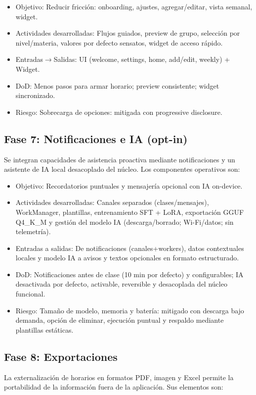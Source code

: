 \begin{itemize}
  \item Objetivo: Reducir fricción: onboarding, ajustes, agregar/editar, vista semanal, widget.
  \item Actividades desarrolladas: Flujos guiados, preview de grupo, selección por nivel/materia, valores por defecto sensatos, widget de acceso rápido.
  \item Entradas$\rightarrow$Salidas: UI (welcome, settings, home, add/edit, weekly) + Widget.
  \item DoD: Menos pasos para armar horario; preview consistente; widget sincronizado.
  \item Riesgo: Sobrecarga de opciones: mitigada con progressive disclosure.
\end{itemize}

\subsection{Fase 7: Notificaciones e IA (opt-in)}
Se integran capacidades de asistencia proactiva mediante notificaciones y un asistente de IA local desacoplado del núcleo. Los componentes operativos son:

\begin{itemize}
  \item Objetivo: Recordatorios puntuales y mensajería opcional con IA on-device.
  \item Actividades desarrolladas: Canales separados (clases/mensajes), WorkManager, plantillas, entrenamiento SFT + LoRA, exportación GGUF Q4\_K\_M y gestión del modelo IA (descarga/borrado; Wi-Fi/datos; sin telemetría).
  \item Entradas a salidas: De notificaciones (canales+workers), datos contextuales locales y modelo IA a avisos y textos opcionales en formato estructurado.
  \item DoD: Notificaciones antes de clase (10 min por defecto) y configurables; IA desactivada por defecto, activable, reversible y desacoplada del núcleo funcional.
  \item Riesgo: Tamaño de modelo, memoria y batería: mitigado con descarga bajo demanda, opción de eliminar, ejecución puntual y respaldo mediante plantillas estáticas.
\end{itemize}

\subsection{Fase 8: Exportaciones}
La externalización de horarios en formatos PDF, imagen y Excel permite la portabilidad de la información fuera de la aplicación. Sus elementos son:


